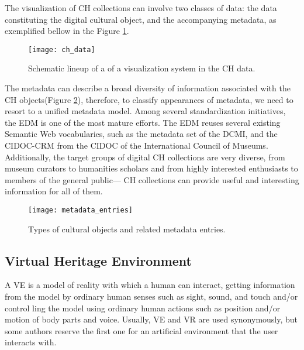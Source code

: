 The visualization of \gls{CH} collections can involve two classes of data: the data constituting the digital cultural object, and
the accompanying metadata, as exemplified bellow in the Figure \ref{fig:ch_data}. 

\begin{figure}[h!]
    \centering
    \texttt{[image: ch\_data]}
    \caption{Schematic lineup of a of a visualization system in the CH data. ~\cite{Windhager2019Visualization}}
    \label{fig:ch_data}
\end{figure}
\FloatBarrier


The metadata can describe a broad diversity of information associated
with the \gls{CH} objects(Figure \ref{fig:ch_objects}), therefore, to classify appearances of metadata, we need to resort to a unified metadata model. 
Among several standardization initiatives, the \gls{EDM} is one of the most mature efforts. 
The \gls{EDM} reuses several existing Semantic Web vocabularies, such as the metadata set of the \gls{DCMI}, and the
\gls{CIDOC-CRM} from the \gls{CIDOC} of the International Council of Museums. 
Additionally, the target groups of digital CH collections are very diverse, from museum curators to humanities scholars and from
highly interested enthusiasts to members of the general public— \gls{CH} collections can provide useful and interesting information for all of them. 


\begin{figure}[h!]
    \centering
    \texttt{[image: metadata\_entries]}
    \caption{Types of cultural objects and related metadata entries. ~\cite{Windhager2019Visualization}}
    \label{fig:ch_objects}
\end{figure}
\FloatBarrier


\subsection{Virtual Heritage Environment}
\label{sec:virtual_heritage}

A \gls{VE} is a model of reality with which a human can interact, getting information 
from the model by ordinary human senses such as sight, sound, and touch and/or control
ling the model using ordinary human actions such as position and/or motion of body parts 
and voice. Usually, \gls{VE} and \gls{VR} are used synonymously, but 
some authors reserve the first one for an artificial environment that the user interacts with.  ~\cite{hale2014handbook}



